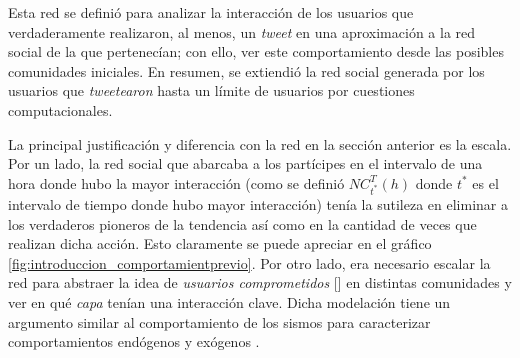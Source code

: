 \documentclass[../main.tex]{subfiles}
\begin{document}
Esta  red se definió para analizar la interacción de los usuarios que verdaderamente realizaron, al menos, un \textit{tweet} en una aproximación a la red social de la que pertenecían; con ello, ver este comportamiento desde las posibles comunidades iniciales.
En resumen, se extiendió la red social generada por los usuarios que \textit{tweetearon} hasta un límite de usuarios por cuestiones computacionales. 

La principal justificación y diferencia con la red en la sección anterior es la escala. Por un lado, la red social que abarcaba a los partícipes en el intervalo de una hora donde hubo la mayor interacción (como se definió $NC_{t^{*}}^{T}(h)$ donde $t^{*}$ es el intervalo de tiempo donde hubo mayor interacción) tenía la sutileza en eliminar a los verdaderos pioneros de la tendencia así como en la cantidad de veces que realizan dicha acción.
Esto claramente se puede apreciar en el gráfico \ref{fig:introduccion_comportamientprevio}. %
Por otro lado, era necesario escalar la red para abstraer la idea de \textit{usuarios comprometidos} [\cite{West2014}] en distintas comunidades y ver en qué \textit{capa} tenían una interacción clave. Dicha modelación tiene un argumento similar al comportamiento de los sismos para caracterizar comportamientos endógenos y exógenos \cite{Klimek2011_comportamientoend}. 











\end{document}
